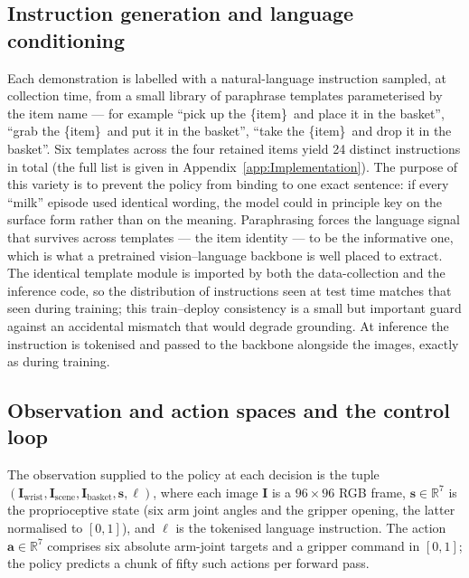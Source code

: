 \subsection{Instruction generation and language conditioning}
\label{sec:m-lang}
Each demonstration is labelled with a natural-language instruction sampled, at
collection time, from a small library of paraphrase templates parameterised by the
item name --- for example ``pick up the \{item\}\ and place it in the basket'', ``grab
the \{item\}\ and put it in the basket'', ``take the \{item\}\ and drop it in the
basket''. Six templates across the four retained items yield 24 distinct
instructions in total (the full list is given in Appendix~\ref{app:Implementation}). The
purpose of this variety is to prevent the policy from binding to one exact sentence:
if every ``milk'' episode used identical wording, the model could in principle key on
the surface form rather than on the meaning. Paraphrasing forces the language signal
that survives across templates --- the item identity --- to be the informative one,
which is what a pretrained vision--language backbone is well placed to extract. The
identical template module is imported by both the data-collection and the inference
code, so the distribution of instructions seen at test time matches that seen during
training; this train--deploy consistency is a small but important guard against an
accidental mismatch that would degrade grounding. At inference the instruction is
tokenised and passed to the backbone alongside the images, exactly as during training.

\subsection{Observation and action spaces and the control loop}
\label{sec:m-spaces}
The observation supplied to the policy at each decision is the tuple
$(\mathbf{I}_{\text{wrist}}, \mathbf{I}_{\text{scene}}, \mathbf{I}_{\text{basket}},
\mathbf{s}, \ell)$, where each image $\mathbf{I}$ is a $96\times96$ RGB frame,
$\mathbf{s}\in\mathbb{R}^{7}$ is the proprioceptive state (six arm joint angles and
the gripper opening, the latter normalised to $[0,1]$), and $\ell$ is the tokenised
language instruction. The action $\mathbf{a}\in\mathbb{R}^{7}$ comprises six
absolute arm-joint targets and a gripper command in $[0,1]$; the policy predicts a
chunk of fifty such actions per forward pass.

